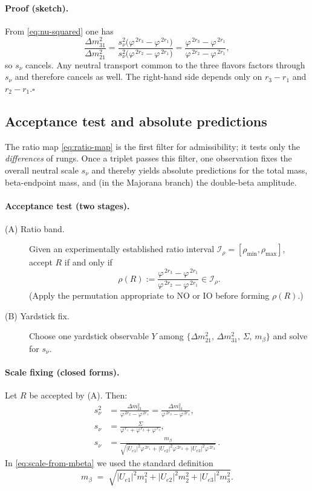 \documentclass[11pt]{article}
\begin{document}
\paragraph{Proof (sketch).}
From \eqref{eq:nu-squared} one has
\[
\frac{\Delta m^2_{31}}{\Delta m^2_{21}}
=\frac{s_\nu^2\bigl(\varphi^{\,2r_3}-\varphi^{\,2r_1}\bigr)}{s_\nu^2\bigl(\varphi^{\,2r_2}-\varphi^{\,2r_1}\bigr)}
=\frac{\varphi^{\,2r_3}-\varphi^{\,2r_1}}{\varphi^{\,2r_2}-\varphi^{\,2r_1}},
\]
so $s_\nu$ cancels. Any neutral transport common to the three flavors factors through $s_\nu$ and therefore cancels as well. The right-hand side depends only on $r_3-r_1$ and $r_2-r_1$.\hfill$\square$

\subsection*{Acceptance test and absolute predictions}

The ratio map \eqref{eq:ratio-map} is the first filter for admissibility; it tests only the \emph{differences} of rungs. Once a triplet passes this filter, one observation fixes the overall neutral scale $s_\nu$ and thereby yields absolute predictions for the total mass, beta-endpoint mass, and (in the Majorana branch) the double-beta amplitude.

\paragraph{Acceptance test (two stages).}
\begin{description}
  \item[(A) Ratio band.] Given an experimentally established ratio interval $\mathcal{I}_\rho=[\rho_{\min},\rho_{\max}]$, accept $R$ if and only if
  \[
  \rho(R):=\frac{\varphi^{\,2r_3}-\varphi^{\,2r_1}}{\varphi^{\,2r_2}-\varphi^{\,2r_1}}\in\mathcal{I}_\rho.
  \]
  (Apply the permutation appropriate to NO or IO before forming $\rho(R)$.)
  \item[(B) Yardstick fix.] Choose one yardstick observable $Y$ among $\{\Delta m^2_{21},\,\Delta m^2_{31},\,\Sigma,\,m_\beta\}$ and solve for $s_\nu$.
\end{description}

\paragraph{Scale fixing (closed forms).}
Let $R$ be accepted by (A). Then:
\begin{align}
s_\nu^2 
&= \frac{\Delta m^2_{21}}{\varphi^{\,2r_2}-\varphi^{\,2r_1}}
= \frac{\Delta m^2_{31}}{\varphi^{\,2r_3}-\varphi^{\,2r_1}}, \label{eq:scale-from-dm2}\\[0.5em]
s_\nu 
&= \frac{\Sigma}{\varphi^{\,r_1}+\varphi^{\,r_2}+\varphi^{\,r_3}}, \label{eq:scale-from-sum}\\[0.5em]
s_\nu 
&= \frac{m_\beta}{\sqrt{|U_{e1}|^2\varphi^{\,2r_1}+|U_{e2}|^2\varphi^{\,2r_2}+|U_{e3}|^2\varphi^{\,2r_3}}}\,.\label{eq:scale-from-mbeta}
\end{align}
In \eqref{eq:scale-from-mbeta} we used the standard definition
\[
m_\beta \;=\; \sqrt{|U_{e1}|^2 m_1^2 + |U_{e2}|^2 m_2^2 + |U_{e3}|^2 m_3^2}.
\]
\end{document}
